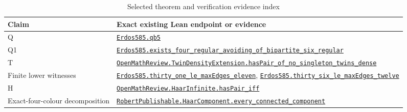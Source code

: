 \documentclass[smallextended]{svjour3}
\begin{document}
{
\begin{longtable}[]{@{}
  >{\raggedright\arraybackslash}p{}
  >{\raggedright\arraybackslash}p{}@{}}
\caption{Selected theorem and verification evidence index}\label{tab:proof-index}\\
\toprule\noalign{}
\begin{minipage}[b]{\linewidth}\raggedright
Claim
\end{minipage} & \begin{minipage}[b]{\linewidth}\raggedright
Exact existing Lean endpoint or evidence
\end{minipage} \\
\midrule\noalign{}
\endhead
\bottomrule\noalign{}
\endlastfoot
Q &
\href{https://github.com/alejandrozu/openmath-2026-judging/blob/70c5ec3107658182f22c207d4c50f53f9cb3e602/robert-review-2026-10-07/lean/Openmath/Proofs/QB5/Statement.lean\#L42}{\texttt{Erdos585.qb5}} \\
Q1 &
\href{https://github.com/alejandrozu/openmath-2026-judging/blob/70c5ec3107658182f22c207d4c50f53f9cb3e602/robert-review-2026-10-07/lean/Openmath/Proofs/QB4/Statement.lean\#L230}{\texttt{Erdos585.exists\_four\_regular\_avoiding\_of\_bipartite\_six\_regular}} \\
T &
\href{https://github.com/alejandrozu/openmath-2026-judging/blob/70c5ec3107658182f22c207d4c50f53f9cb3e602/robert-review-2026-10-07/lean/TwinDensityExtension.lean\#L132}{\texttt{OpenMathReview.TwinDensityExtension.hasPair\_of\_no\_singleton\_twins\_dense}} \\
Finite lower witnesses &
\href{https://github.com/alejandrozu/openmath-2026-judging/blob/70c5ec3107658182f22c207d4c50f53f9cb3e602/robert-review-2026-10-07/lean/Openmath/Proofs/Final.lean\#L112}{\texttt{Erdos585.thirty\_one\_le\_maxEdges\_eleven}},
\href{https://github.com/alejandrozu/openmath-2026-judging/blob/70c5ec3107658182f22c207d4c50f53f9cb3e602/robert-review-2026-10-07/lean/Openmath/Proofs/Final.lean\#L116}{\texttt{Erdos585.thirty\_six\_le\_maxEdges\_twelve}} \\
H &
\href{https://github.com/alejandrozu/openmath-2026-judging/blob/70c5ec3107658182f22c207d4c50f53f9cb3e602/robert-review-2026-10-07/lean/HaarInfinite.lean\#L110}{\texttt{OpenMathReview.HaarInfinite.hasPair\_iff}} \\
Exact-four-colour decomposition &
\href{https://github.com/alejandrozu/openmath-2026-judging/blob/70c5ec3107658182f22c207d4c50f53f9cb3e602/robert-review-2026-10-07/lean/HaarComponents.lean\#L73}{\texttt{RobertPublishable.HaarComponent.every\_connected\_component}} \\

\end{longtable}}
\end{document}
